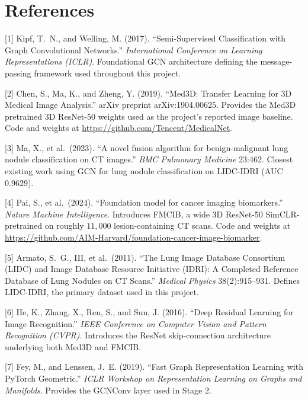 \documentclass[10pt,letterpaper,twocolumn]{article}
\begin{document}
\section*{References}
\label{sec:references}

\begingroup
\small
\setlength{\parskip}{0.25em}
\setlength{\parindent}{0pt}

[1] Kipf, T.~N., and Welling, M. (2017). ``Semi-Supervised Classification with Graph Convolutional Networks.'' \textit{International Conference on Learning Representations (ICLR)}. Foundational GCN architecture defining the message-passing framework used throughout this project.

[2] Chen, S., Ma, K., and Zheng, Y. (2019). ``Med3D: Transfer Learning for 3D Medical Image Analysis.'' arXiv preprint arXiv:1904.00625. Provides the Med3D pretrained 3D ResNet-50 weights used as the project's reported image baseline. Code and weights at \url{https://github.com/Tencent/MedicalNet}.

[3] Ma, X., et al.\ (2023). ``A novel fusion algorithm for benign-malignant lung nodule classification on CT images.'' \textit{BMC Pulmonary Medicine} 23:462. Closest existing work using GCN for lung nodule classification on LIDC-IDRI (AUC $0.9629$).

[4] Pai, S., et al.\ (2024). ``Foundation model for cancer imaging biomarkers.'' \textit{Nature Machine Intelligence}. Introduces FMCIB, a wide 3D ResNet-50 SimCLR-pretrained on roughly $11{,}000$ lesion-containing CT scans. Code and weights at \url{https://github.com/AIM-Harvard/foundation-cancer-image-biomarker}.

[5] Armato, S.~G., III, et al.\ (2011). ``The Lung Image Database Consortium (LIDC) and Image Database Resource Initiative (IDRI): A Completed Reference Database of Lung Nodules on CT Scans.'' \textit{Medical Physics} 38(2):915--931. Defines LIDC-IDRI, the primary dataset used in this project.

[6] He, K., Zhang, X., Ren, S., and Sun, J. (2016). ``Deep Residual Learning for Image Recognition.'' \textit{IEEE Conference on Computer Vision and Pattern Recognition (CVPR)}. Introduces the ResNet skip-connection architecture underlying both Med3D and FMCIB.

[7] Fey, M., and Lenssen, J.~E. (2019). ``Fast Graph Representation Learning with PyTorch Geometric.'' \textit{ICLR Workshop on Representation Learning on Graphs and Manifolds}. Provides the GCNConv layer used in Stage 2.
\end{document}
